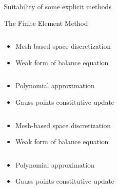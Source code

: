 \begin{frame}{Suitability of some explicit methods}
  \begin{block}{The Finite Element Method \cite{Belytschko}}
    \vskip 4pt
    \begin{overprint}
      \begin{columns}
        \begin{footnotesize}
          \begin{column}{0.5\textwidth}
            \begin{itemize}
            \item[] Mesh-based space discretization
            \item[] Weak form of balance equation
            \end{itemize}
          \end{column}
          \begin{column}{0.5\textwidth} 
            \begin{itemize}
            \item[] Polynomial approximation
            \item[] Gauss points constitutive update
            \end{itemize}
          \end{column}
        \end{footnotesize}
      \end{columns}
      \begin{columns}
        \begin{footnotesize}
          \begin{column}{0.5\textwidth}
            \begin{itemize}
            \item[] Mesh-based space discretization
            \item[] Weak form of balance equation
            \end{itemize}
          \end{column}
          \begin{column}{0.5\textwidth} 
            \begin{itemize}
            \item[] Polynomial approximation
            \item[] Gauss points constitutive update
            \end{itemize}
          \end{column}
        \end{footnotesize}

\end{columns}
\end{overprint}
\end{block}
\end{frame}
